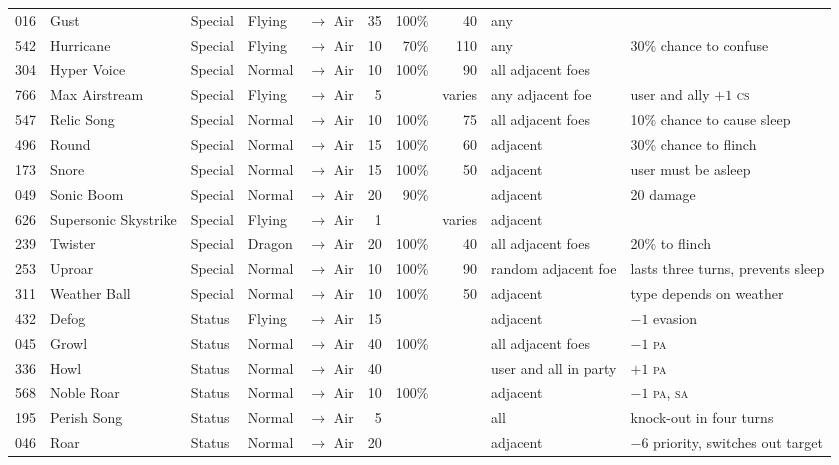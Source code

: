 \documentclass{article}
\newcommand{\pa}{\textsc{pa}}
\newcommand{\sa}{\textsc{sa}}
\newcommand{\cs}{\textsc{cs}}
\begin{document}
\begin{landscape}
\begin{longtable}{rl|l|ll|rrr|l|l}
016 & Gust & Special & Flying & $\rightarrow$ Air & 35 & 100\% & 40 & any &  \\
542 & Hurricane & Special & Flying & $\rightarrow$ Air & 10 & 70\% & 110 & any & 30\% chance to confuse \\
304 & Hyper Voice & Special & Normal & $\rightarrow$ Air & 10 & 100\% & 90 & all adjacent foes &  \\
766 & Max Airstream & Special & Flying & $\rightarrow$ Air & 5 &  & varies & any adjacent foe & user and ally $+1$ \cs \\
547 & Relic Song & Special & Normal & $\rightarrow$ Air & 10 & 100\% & 75 & all adjacent foes & 10\% chance to cause sleep \\
496 & Round & Special & Normal & $\rightarrow$ Air & 15 & 100\% & 60 & adjacent & 30\% chance to flinch \\
173 & Snore & Special & Normal & $\rightarrow$ Air & 15 & 100\% & 50 & adjacent & user must be asleep \\
049 & Sonic Boom & Special & Normal & $\rightarrow$ Air & 20 & 90\% &  & adjacent & 20 damage \\
626 & Supersonic Skystrike & Special & Flying & $\rightarrow$ Air & 1 &  & varies & adjacent &  \\
239 & Twister & Special & Dragon & $\rightarrow$ Air & 20 & 100\% & 40 & all adjacent foes & 20\% to flinch \\
253 & Uproar & Special & Normal & $\rightarrow$ Air & 10 & 100\% & 90 & random adjacent foe & lasts three turns, prevents sleep \\
311 & Weather Ball & Special & Normal & $\rightarrow$ Air & 10 & 100\% & 50 & adjacent & type depends on weather \\
\hline
432 & Defog & Status & Flying & $\rightarrow$ Air & 15 &  &  & adjacent & $-1$ evasion \\
045 & Growl & Status & Normal & $\rightarrow$ Air & 40 & 100\% &  & all adjacent foes & $-1$ \pa \\
336 & Howl & Status & Normal & $\rightarrow$ Air & 40 &  &  & user and all in party & $+1$ \pa \\
568 & Noble Roar & Status & Normal & $\rightarrow$ Air & 10 & 100\% &  & adjacent & $-1$ \pa, \sa \\
195 & Perish Song & Status & Normal & $\rightarrow$ Air & 5 &  &  & all & knock-out in four turns \\
046 & Roar & Status & Normal & $\rightarrow$ Air & 20 &  &  & adjacent & $-6$ priority, switches out target \\

\end{longtable}
\end{landscape}
\end{document}
